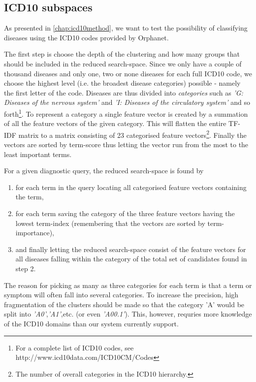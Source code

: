 \documentclass[10pt,letterpaper,two column,final]{article}
\begin{document}

\subsection{ICD10 subspaces}
\label{chap:icd10implementation}
As presented in \ref{chap:icd10method}, we want to test the possibility
of classifying diseases using the ICD10 codes provided by Orphanet.


The first step is choose the depth of the clustering and how many groups that should
be included in the reduced search-space. Since we only have a couple of thousand 
diseases and only one, two or none diseases for each full ICD10 code, we choose the
highest level (i.e. the broadest disease categories) possible - namely the first letter
of the code. Diseases are thus divided into \textit{categories} such as \textit{'G: Diseases of the nervous system'}
and \textit{'I: Diseases of the circulatory system'} and so forth\footnote{For a complete list of ICD10 codes, see http://www.icd10data.com/ICD10CM/Codes}. To represent a
category a single feature vector is created by a summation of all the feature vectors of 
the given category. This will flatten the entire TF-IDF matrix to a matrix consisting
of 23 categorised feature vectors\footnote{The number of overall categories in the ICD10 hierarchy.}. 
Finally the vectors are sorted by term-score thus letting the vector run from
the most to the least important terms.

For a given diagnostic query, the reduced search-space is found by
\begin{enumerate}
    \item for each term in the query locating all categorised feature vectors containing the term,
    \item for each term saving the category of the three feature vectors having the lowest term-index (remembering that the vectors are sorted by term-importance),
    \item and finally letting the reduced search-space consist of the feature vectors for all diseases falling within the category of the total set of candidates found in step 2.
\end{enumerate}
The reason for picking as many as three categories for each term is that
a term or symptom will often fall into several categories. To increase
the precision, high fragmentation of the clusters should be made so that
the category 'A' would be split into \textit{'A0'},\textit{'A1'},etc. (or even \textit{'A00.1'}).
This, however, requries more knowledge of the ICD10 domains than our
system currently support. 
\end{document}
